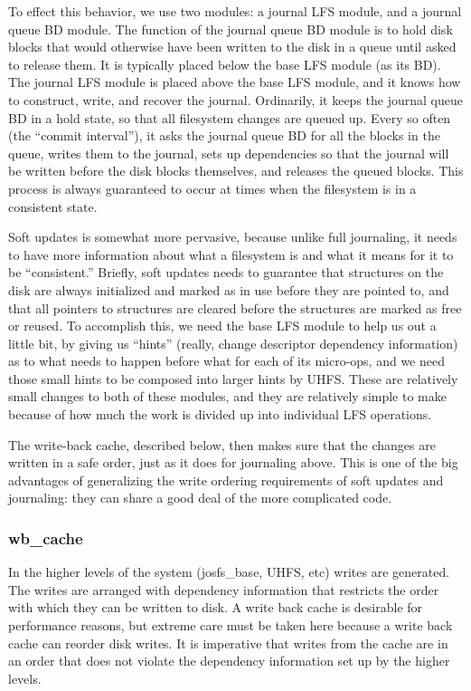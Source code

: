 To effect this behavior, we use two modules: a journal LFS module, and a journal
queue BD module. The function of the journal queue BD module is to hold disk
blocks that would otherwise have been written to the disk in a queue until asked
to release them. It is typically placed below the base LFS module (as its BD).
The journal LFS module is placed above the base LFS module, and it knows how to
construct, write, and recover the journal. Ordinarily, it keeps the journal
queue BD in a hold state, so that all filesystem changes are queued up. Every so
often (the ``commit interval''), it asks the journal queue BD for all the blocks
in the queue, writes them to the journal, sets up dependencies so that the
journal will be written before the disk blocks themselves, and releases the
queued blocks. This process is always guaranteed to occur at times when the
filesystem is in a consistent state.

Soft updates is somewhat more pervasive, because unlike full journaling, it
needs to have more information about what a filesystem is and what it means for
it to be ``consistent.'' Briefly, soft updates needs to guarantee that
structures on the disk are always initialized and marked as in use before they
are pointed to, and that all pointers to structures are cleared before the
structures are marked as free or reused. To accomplish this, we need the base
LFS module to help us out a little bit, by giving us ``hints'' (really, change
descriptor dependency information) as to what needs to happen before what for
each of its micro-ops, and we need those small hints to be composed into larger
hints by UHFS. These are relatively small changes to both of these modules, and
they are relatively simple to make because of how much the work is divided up
into individual LFS operations.

The write-back cache, described below, then makes sure that the changes are
written in a safe order, just as it does for journaling above. This is one of
the big advantages of generalizing the write ordering requirements of soft
updates and journaling: they can share a good deal of the more complicated
code.

\subsubsection{wb\_cache}
\label{sec:solution:impl:wbcache}

In the higher levels of the system (josfs\_base, UHFS, etc) writes are
generated. The writes are arranged with dependency information that restricts
the order with which they can be written to disk. A write back cache is
desirable for performance reasons, but extreme care must be taken here because a
write back cache can reorder disk writes. It is imperative that writes from the
cache are in an order that does not violate the dependency information set up by
the higher levels.

